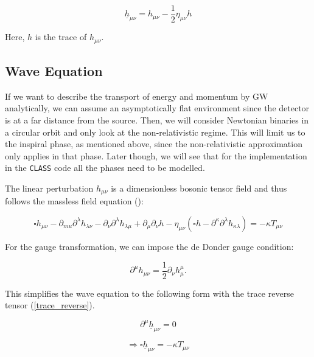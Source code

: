 \begin{equation}
    \underline{h}_{\mu\nu} = h_{\mu\nu}-\frac{1}{2} \eta_{\mu\nu}h
    \label{trace_reverse}
\end{equation}

Here, $h$ is the trace of $h_{\mu\nu}$.

\subsection{Wave Equation}

If we want to describe the transport of energy and momentum by GW analytically, we can assume an asymptotically flat environment since the detector is at a far distance from the source. Then, we will consider Newtonian binaries in a circular orbit and only look at the non-relativistic regime. This will limit us to the inspiral phase, as mentioned above, since the non-relativistic approximation only applies in that phase. Later though, we will see that for the implementation in the {\tt CLASS} code all the phases need to be modelled.

The linear perturbation $h_{\mu\nu}$ is a dimensionless bosonic tensor field and thus follows the massless field equation (\cite{van_holten_gravitational_2019}):

\begin{equation}
    \square h_{\mu\nu} -\partial_{mu} \partial^\lambda h_{\lambda\nu}-\partial_\nu\partial^\lambda h_{\lambda\mu}+\partial_\mu \partial_\nu h - \eta_{\mu\nu}(\square h-\partial^\kappa \partial^\lambda h_{\kappa\lambda})=-\kappa T_{\mu\nu}
\end{equation}

For the gauge transformation, we can impose the de Donder gauge condition:

\begin{equation}
    \partial^\mu h_{\mu\nu} = \frac{1}{2}\partial_\nu h_\mu^\mu .
    \label{de_donder}
\end{equation}

This simplifies the wave equation to the following form with the trace reverse tensor (\ref{trace_reverse}).

\begin{equation}
    \partial^\mu \underline{h}_{\mu\nu}=0
\end{equation}

\begin{equation}
    \Rightarrow \square \underline{h}_{\mu\nu}=-\kappa T_{\mu\nu}
\end{equation}

